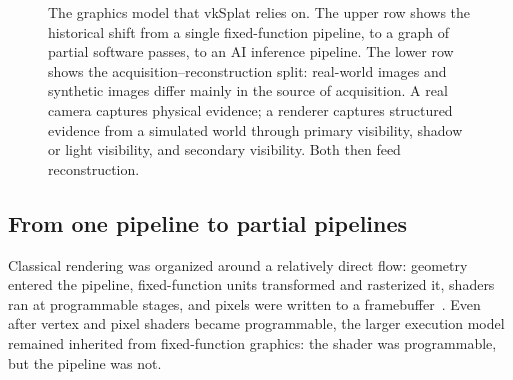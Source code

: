 \documentclass[10pt,journal]{IEEEtran}
\begin{document}
\begin{figure}[t]
{%
}
\caption{The graphics model that vkSplat relies on. The upper row shows
the historical shift from a single fixed-function pipeline, to a graph
of partial software passes, to an AI inference pipeline. The lower row
shows the acquisition--reconstruction split: real-world images and
synthetic images differ mainly in the source of acquisition. A real
camera captures physical evidence; a renderer captures structured
evidence from a simulated world through primary visibility, shadow or
light visibility, and secondary visibility. Both then feed
reconstruction.}
\label{fig:graphics-evolution}
\end{figure}

\subsection{From one pipeline to partial pipelines}

Classical rendering was organized around a relatively direct flow:
geometry entered the pipeline, fixed-function units transformed and
rasterized it, shaders ran at programmable stages, and pixels were
written to a framebuffer~\cite{akenine2018}. Even after vertex and
pixel shaders became programmable, the larger execution model remained
inherited from fixed-function graphics: the shader was programmable,
but the pipeline was not.
\end{document}
